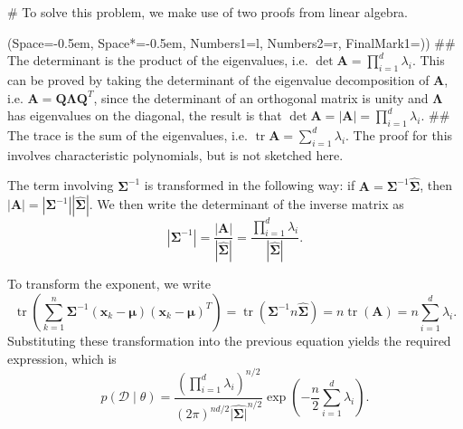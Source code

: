 \documentclass[12pt, a4paper]{article}
\newcommand{\listSpace}{-0.5em}%
\newcommand{\D}{\mathcal{D}}
\newcommand{\vect}[1]{\bm{#1}}
\newcommand{\abs}[1]{\left\lvert#1\right\rvert}
\begin{document}
\begin{easylist}[enumerate]
# To solve this problem, we make use of two proofs from linear algebra.

\begin{easylist}
\ListProperties(Space=\listSpace, Space*=\listSpace, Numbers1=l, Numbers2=r, FinalMark1={)})
## The determinant is the product of the eigenvalues, i.e. $\det \vect{A} = \prod_{i=1}^{d} \lambda_i$.
This can be proved by taking the determinant of the eigenvalue decomposition of $\vect{A}$, i.e. $\vect{A}  = \vect{Q}  \vect{\Lambda} \vect{Q}^T$, since the determinant of an orthogonal matrix is unity and $\vect{\Lambda}$ has eigenvalues on the diagonal, the result is that $\det \vect{A} = \abs{\vect{A}} = \prod_{i=1}^{d} \lambda_i$.
## The trace is the sum of the eigenvalues, i.e. $\operatorname{tr} \vect{A} =\sum_{i=1}^{d} \lambda_i$. The proof for this involves characteristic polynomials, but is not sketched here.
\end{easylist}

The term involving $\vect{\Sigma}^{-1}$ is transformed in the following way: if $\vect{A} = \vect{\Sigma}^{-1} \hat{\vect{\Sigma}}$, then $\abs{\vect{A}} = \abs{\vect{\Sigma}^{-1}} | \hat{\vect{\Sigma}} |$. 
We then write the determinant of the inverse matrix as
\begin{equation*}
	\abs{\vect{\Sigma}^{-1}} = \frac{\abs{\vect{A}}}{| \hat{\vect{\Sigma}} |} = \frac{\prod_{i=1}^{d} \lambda_i}{| \hat{\vect{\Sigma}} |}.
\end{equation*}

To transform the exponent, we write
\begin{equation*}
	 \operatorname{tr} \left( \sum_{k=1}^{n}  \vect{\Sigma}^{-1} \left( \vect{x}_k - \vect{\mu} \right) \left( \vect{x}_k - \vect{\mu} \right)^T \right)
	 =
	 \operatorname{tr} \left( \vect{\Sigma}^{-1} n \hat{\vect{\Sigma}}  \right)
	 =
	 n  \operatorname{tr} \left( \vect{A} \right) = n \sum_{i=1}^{d} \lambda_i.
\end{equation*}
Substituting these transformation into the previous equation yields the required expression, which is
\begin{equation}
\label{eq:prob3_13}
	p(\D  \mid  \theta) = \frac{\left( \prod_{i=1}^{d} \lambda_i \right)^{n/2}}{\left(2 \pi \right)^{nd/2} \hat{\abs{\vect{\Sigma}}}^{n/2} } \exp \left( -\frac{n}{2} \sum_{i=1}^{d} \lambda_i \right).
\end{equation}


\end{easylist}
\end{document}
